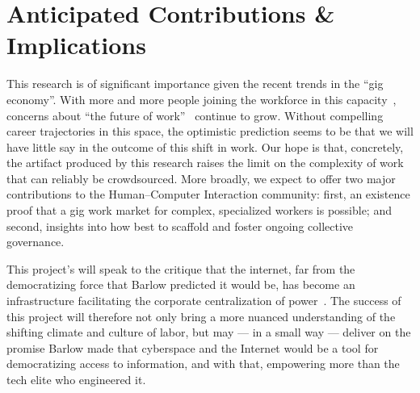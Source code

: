 \documentclass{article}
\begin{document}
\section*{Anticipated Contributions \& Implications}
This research is of significant importance given the recent trends in the ``gig economy''.
With more and more people joining the workforce in this capacity~\cite{pewSharing,pewSharing24percent},
concerns about ``the future of work''~\cite{waterCooler,crowdworkFuture} continue to grow.
Without compelling career trajectories in this space,
the optimistic prediction seems to be that we will have little say in the outcome of this shift in work.
Our hope is that, concretely, the artifact produced by this research raises the limit on the complexity of work that can reliably be crowdsourced.
More broadly, we expect to offer two major contributions to the Human--Computer Interaction community:
first, an existence proof that a gig work market for complex, specialized workers is possible; and
second, insights into how best to scaffold and foster ongoing collective governance.

This project's will speak to the critique that the internet,
far from the democratizing force that Barlow predicted it would be,
has become an infrastructure facilitating the corporate centralization of power~\cite{barlow2009declaration,jones2011does,EboCybertopia}.
The success of this project will therefore not only
bring a more nuanced understanding of the shifting climate and culture of labor,
but may
--- in a small way ---
deliver on the promise Barlow made that
cyberspace and the Internet would be a tool for democratizing access to information, and with that,
empowering more than the tech elite who engineered it.


\pagebreak
\printbibliography{}
% 
% 
\end{document}
